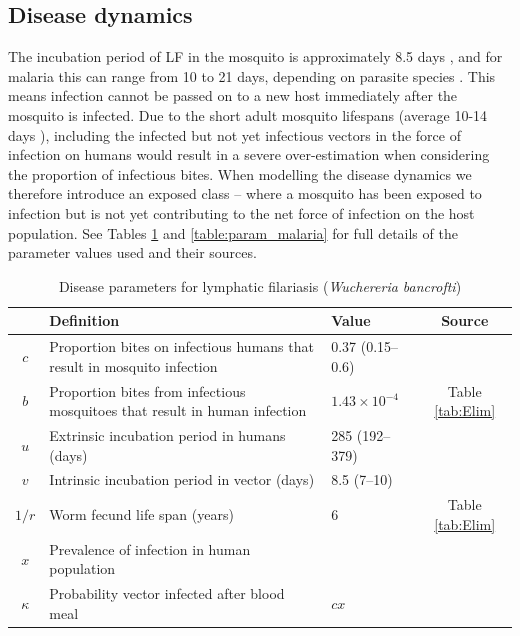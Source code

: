\subsection{Disease dynamics}

The incubation period of LF in the mosquito is approximately 8.5 days \cite{le2007,erickson2009}, and for malaria this can range from 10 to 21 days, depending on parasite species \cite{CDCMalaria}. This means infection cannot be passed on to a new host immediately after the mosquito is infected. Due to the short adult mosquito lifespans (average 10-14 days \cite{le2007}), including the infected but not yet infectious vectors in the force of infection on humans would result in a severe over-estimation when considering the proportion of infectious bites. When modelling the disease dynamics we therefore introduce an exposed class -- where a mosquito has been exposed to infection but is not yet contributing to the net force of infection on the host population. See Tables \ref{table:param_LF} and \ref{table:param_malaria} for full details of the parameter values used and their sources.

\begin{table}[t]
\caption[LF disease parameters.]{Disease parameters for lymphatic filariasis (\textit{Wuchereria bancrofti})}%
\vspace{.1cm}
\centering %
\begin{tabular}{|c|p{65mm}|p{35mm}|c|}%
\hline                        %
 & Definition & Value & Source \\ [0.5ex]%
\hline                  %
$c$ & Proportion bites on infectious humans that result in mosquito infection & 0.37 (0.15--0.6) & \cite{gambhir2008,Subramanian1998}\\
$b$ & Proportion bites from infectious mosquitoes that result in human infection & $1.43\times 10^{-4}$ & Table \ref{tab:Elim} \\
$u$ & Extrinsic incubation period in humans (days) & 285 (192--379)& \cite{Addiss2000} \\
$v$ & Intrinsic incubation period in vector (days) & 8.5 (7--10) & \cite{erickson2009} \\
$1/r$ & Worm fecund life span (years) & 6 & Table \ref{tab:Elim} \\
$x$ & Prevalence of infection in human population & & \\
$\kappa$ & Probability  vector infected after blood meal & $cx$ & \\
[1ex]      %
\hline%
\end{tabular}
\label{table:param_LF}%
\end{table}

